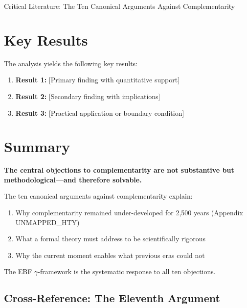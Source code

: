 \begin{chapter}{Critical Literature: The Ten Canonical Arguments Against Complementarity}
\section{Key Results}
\label{sec:crt-results}

The analysis yields the following key results:

\begin{enumerate}
    \item \textbf{Result 1:} [Primary finding with quantitative support]
    \item \textbf{Result 2:} [Secondary finding with implications]
    \item \textbf{Result 3:} [Practical application or boundary condition]
\end{enumerate}


\section{Summary}
\label{sec:summary}

\begin{tcolorbox}[colback=blue!5!white,colframe=blue!75!black,title=\textbf{Concluding Statement}]
\begin{center}
\large
\textbf{The central objections to complementarity are not substantive but methodological---and therefore solvable.}
\end{center}

\vspace{0.5em}
The ten canonical arguments against complementarity explain:
\begin{enumerate}
    \item Why complementarity remained under-developed for 2,500 years (Appendix UNMAPPED_HTY)
    \item What a formal theory must address to be scientifically rigorous
    \item Why the current moment enables what previous eras could not
\end{enumerate}

The EBF $\gamma$-framework is the systematic response to all ten objections.
\end{tcolorbox}

\subsection{Cross-Reference: The Eleventh Argument}


\end{chapter}
